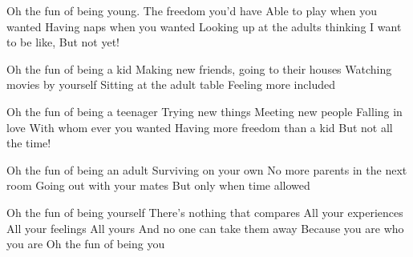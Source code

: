 ﻿Oh the fun of being young.
The freedom you’d have
Able to play when you wanted
Having naps when you wanted
Looking up at the adults thinking
I want to be like,
But not yet!


Oh the fun of being a kid
Making new friends, 
going to their houses
Watching movies by yourself
Sitting at the adult table
Feeling more included


Oh the fun of being a teenager
Trying new things
Meeting new people
Falling in love
With whom ever you wanted
Having more freedom than a kid
But not all the time!


Oh the fun of being an adult
Surviving on your own
No more parents in the next room
Going out with your mates
But only when time allowed


Oh the fun of being yourself
There’s nothing that compares
All your experiences
All your feelings
All yours 
And no one can take them away
Because you are who you are
Oh the fun of being you